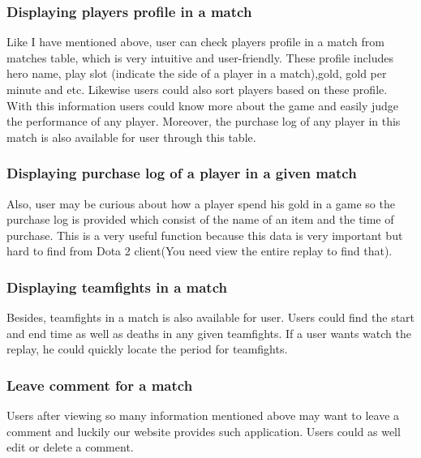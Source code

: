 \documentclass[a4paper]{article}
\begin{document}
\subsubsection{Displaying players profile in a match}
Like I have mentioned above, user can check players profile in a match from matches table, which is very intuitive and user-friendly. These profile includes hero name, play slot (indicate the side of a player in a match),gold, gold per minute and etc. Likewise users could also sort players based on these profile. With this information users could know more about the game and easily judge the performance of any player. Moreover, the purchase log of any player in this match is also available for user through this table.
\subsubsection{Displaying purchase log of a player in a given match}
Also, user may be curious about how a player spend his gold in a game so the purchase log is provided which consist of the name of an item and the time of purchase. This is a very useful function because this data is very important but hard to find from Dota 2 client(You need view the entire replay to find that). 
\subsubsection{Displaying teamfights in a match}
Besides, teamfights in a match is also available for user. Users could find the start and end time as well as deaths in any given teamfights. If a user wants watch the replay, he could quickly locate the period for teamfights.
\subsubsection{Leave comment for a match}
Users after viewing so many information mentioned above may want to leave a comment and luckily our website provides such application. Users could as well edit or delete a comment.

\end{document}
